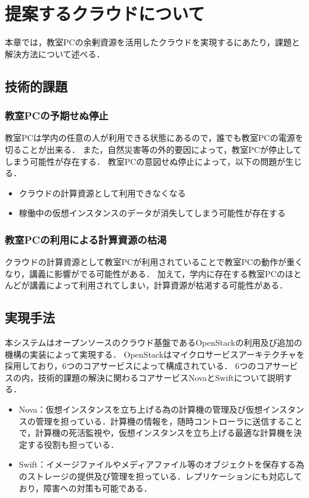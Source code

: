 \documentclass[10pt,a4paper]{jsarticle}
\begin{document}
\section{提案するクラウドについて}
本章では，教室PCの余剰資源を活用したクラウドを実現するにあたり，課題と解決方法について述べる．
\subsection{技術的課題}
\subsubsection{教室PCの予期せぬ停止}
教室PCは学内の任意の人が利用できる状態にあるので，誰でも教室PCの電源を切ることが出来る．
また，自然災害等の外的要因によって，教室PCが停止してしまう可能性が存在する．
教室PCの意図せぬ停止によって，以下の問題が生じる．
\begin{itemize}
	\item クラウドの計算資源として利用できなくなる
	\item 稼働中の仮想インスタンスのデータが消失してしまう可能性が存在する
\end{itemize}
\subsubsection{教室PCの利用による計算資源の枯渇}
クラウドの計算資源として教室PCが利用されていることで教室PCの動作が重くなり，講義に影響がでる可能性がある．
加えて，学内に存在する教室PCのほとんどが講義によって利用されてしまい，計算資源が枯渇する可能性がある．

\subsection{実現手法}
本システムはオープンソースのクラウド基盤であるOpenStack\cite{openstack}の利用及び追加の機構の実装によって実現する．
OpenStackはマイクロサービスアーキテクチャを採用しており，6つのコアサービスによって構成されている．
6つのコアサービスの内，技術的課題の解決に関わるコアサービスNovaとSwiftについて説明する．
\begin{itemize}
	\item Nova：仮想インスタンスを立ち上げる為の計算機の管理及び仮想インスタンスの管理を担っている．計算機の情報を，随時コントローラに送信することで，計算機の死活監視や，仮想インスタンスを立ち上げる最適な計算機を決定する役割も担っている．
	\item Swift：イメージファイルやメディアファイル等のオブジェクトを保存する為のストレージの提供及び管理を担っている．レプリケーションにも対応しており，障害への対策も可能である．
\end{itemize}
\end{document}
